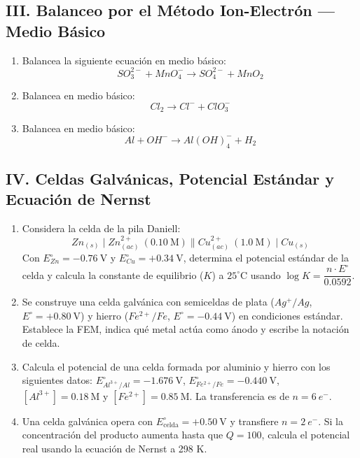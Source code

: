 \documentclass[letterpaper, 12pt, twoside]{article}
\begin{document}
\subsection*{III. Balanceo por el Método Ion-Electrón — Medio Básico}

\begin{enumerate}[label=\textbf{\arabic*.}, start=11, itemsep=2.5em, leftmargin=*]

\item Balancea la siguiente ecuación en medio básico:
\[ SO_3^{2-} + MnO_4^- \rightarrow SO_4^{2-} + MnO_2 \]

\item Balancea en medio básico:
\[ Cl_2 \rightarrow Cl^- + ClO_3^- \]

\item Balancea en medio básico:
\[ Al + OH^- \rightarrow Al(OH)_4^- + H_2 \]

\end{enumerate}
\newpage
\subsection*{IV. Celdas Galvánicas, Potencial Estándar y Ecuación de Nernst}

\begin{enumerate}[label=\textbf{\arabic*.}, start=14, itemsep=2.5em, leftmargin=*]

\item Considera la celda de la pila Daniell:
\[ Zn_{(s)} \mid Zn^{2+}_{(ac)}\ (0.10\ \text{M}) \parallel Cu^{2+}_{(ac)}\ (1.0\ \text{M}) \mid Cu_{(s)} \]
Con $E^\circ_{Zn} = -0.76\ \text{V}$ y $E^\circ_{Cu} = +0.34\ \text{V}$, determina el potencial estándar de la celda y calcula la constante de equilibrio ($K$) a $25^\circ\text{C}$ usando $\log K = \dfrac{n \cdot E^\circ}{0.0592}$.

\item Se construye una celda galvánica con semiceldas de plata ($Ag^+/Ag$, $E^\circ = +0.80\ \text{V}$) y hierro ($Fe^{2+}/Fe$, $E^\circ = -0.44\ \text{V}$) en condiciones estándar. Establece la FEM, indica qué metal actúa como ánodo y escribe la notación de celda.

\item Calcula el potencial de una celda formada por aluminio y hierro con los siguientes datos: $E^\circ_{Al^{3+}/Al} = -1.676\ \text{V}$, $E^\circ_{Fe^{2+}/Fe} = -0.440\ \text{V}$, $[Al^{3+}] = 0.18\ \text{M}$ y $[Fe^{2+}] = 0.85\ \text{M}$. La transferencia es de $n = 6\ e^-$.

\item Una celda galvánica opera con $E^\circ_{\text{celda}} = +0.50\ \text{V}$ y transfiere $n = 2\ e^-$. Si la concentración del producto aumenta hasta que $Q = 100$, calcula el potencial real usando la ecuación de Nernst a 298 K.

\end{enumerate}
\end{document}
